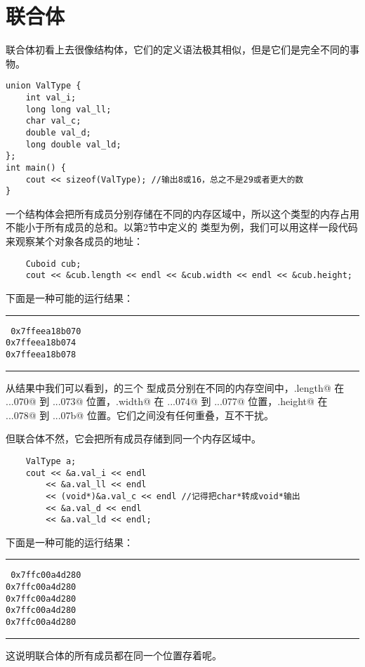 \section{联合体}
联合体初看上去很像结构体，它们的定义语法极其相似，但是它们是完全不同的事物。
\begin{lstlisting}
union ValType {
    int val_i;
    long long val_ll;
    char val_c;
    double val_d;
    long double val_ld;
};
int main() {
    cout << sizeof(ValType); //输出8或16，总之不是29或者更大的数
}
\end{lstlisting}
一个结构体会把所有成员分别存储在不同的内存区域中，所以这个类型的内存占用不能小于所有成员的总和。以第2节中定义的 \lstinline@Cuboid@ 类型为例，我们可以用这样一段代码来观察某个对象各成员的地址：
\begin{lstlisting}
    Cuboid cub;
    cout << &cub.length << endl << &cub.width << endl << &cub.height;
\end{lstlisting}
下面是一种可能的运行结果：\\\noindent\rule{\linewidth}{.2pt}\texttt{
0x7ffeea18b070\\
0x7ffeea18b074\\
0x7ffeea18b078
}\\\noindent\rule{\linewidth}{.2pt}\par
从结果中我们可以看到，\lstinline@cub@ 的三个 \lstinline@int@ 型成员分别在不同的内存空间中，\lstinline@cub.length@ 在 \lstinline@...070@ 到 \lstinline@...073@ 位置，\lstinline@cub.width@ 在 \lstinline@...074@ 到 \lstinline@...077@ 位置，\lstinline@cub.height@ 在 \lstinline@...078@ 到 \lstinline@...07b@ 位置。它们之间没有任何重叠，互不干扰。\par
但联合体不然，它会把所有成员存储到同一个内存区域中。
\begin{lstlisting}
    ValType a;
    cout << &a.val_i << endl
        << &a.val_ll << endl
        << (void*)&a.val_c << endl //记得把char*转成void*输出
        << &a.val_d << endl
        << &a.val_ld << endl;
\end{lstlisting}
下面是一种可能的运行结果：\\\noindent\rule{\linewidth}{.2pt}\texttt{
0x7ffc00a4d280\\
0x7ffc00a4d280\\
0x7ffc00a4d280\\
0x7ffc00a4d280\\
0x7ffc00a4d280
}\\\noindent\rule{\linewidth}{.2pt}
这说明联合体的所有成员都在同一个位置存着呢。